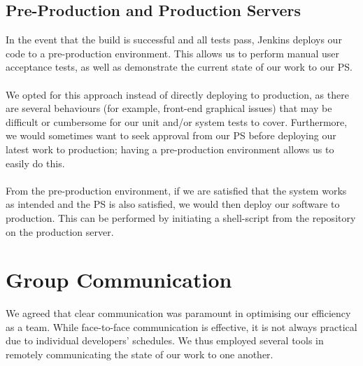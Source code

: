 \documentclass[a4paper, 10pt]{report}
\begin{document}
\subsection{Pre-Production and Production Servers}
In the event that the build is successful and all tests pass, Jenkins deploys our code to a pre-production environment. This allows us to perform manual user acceptance tests, as well as demonstrate the current state of our work to our PS.
\\\\
We opted for this approach instead of directly deploying to production, as there are several behaviours (for example, front-end graphical issues) that may be difficult or cumbersome for our unit and/or system tests to cover. Furthermore, we would sometimes want to seek approval from our PS before deploying our latest work to production; having a pre-production environment allows us to easily do this.
\\\\
From the pre-production environment, if we are satisfied that the system works as intended and the PS is also satisfied, we would then deploy our software to production. This can be performed by initiating a shell-script from the repository on the production server.
\section{Group Communication}
We agreed that clear communication was paramount in optimising our efficiency as a team. While face-to-face communication is effective, it is not always practical due to individual developers' schedules. We thus employed several tools in remotely communicating the state of our work to one another.
\end{document}
